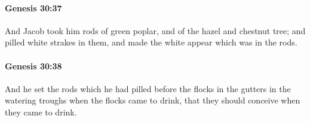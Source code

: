 		\paragraph{Genesis 30:37} %
			\label{GENESIS-30-37}

			And Jacob took him rods of green poplar, and of the hazel and chestnut tree; and pilled white strakes in them, and made the white appear which was in the rods.


		\paragraph{Genesis 30:38} %
			\label{GENESIS-30-38}

			And he set the rods which he had pilled before the flocks in the gutters in the watering troughs when the flocks came to drink, that they should conceive when they came to drink.


